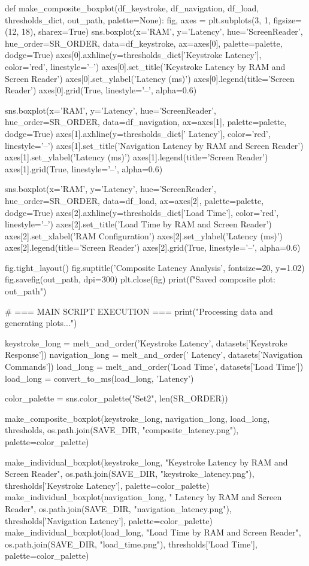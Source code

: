\begin{pyverbatim}
	def make_composite_boxplot(df_keystroke, df_navigation, df_load, thresholds_dict, out_path, palette=None):
	fig, axes = plt.subplots(3, 1, figsize=(12, 18), sharex=True)
	sns.boxplot(x='RAM', y='Latency', hue='ScreenReader', hue_order=SR_ORDER,
	data=df_keystroke, ax=axes[0], palette=palette, dodge=True)
	axes[0].axhline(y=thresholds_dict['Keystroke Latency'], color='red', linestyle='--')
	axes[0].set_title('Keystroke Latency by RAM and Screen Reader')
	axes[0].set_ylabel('Latency (ms)')
	axes[0].legend(title='Screen Reader')
	axes[0].grid(True, linestyle='--', alpha=0.6)

	sns.boxplot(x='RAM', y='Latency', hue='ScreenReader', hue_order=SR_ORDER,
	data=df_navigation, ax=axes[1], palette=palette, dodge=True)
	axes[1].axhline(y=thresholds_dict[' Latency'], color='red', linestyle='--')
	axes[1].set_title('Navigation Latency by RAM and Screen Reader')
	axes[1].set_ylabel('Latency (ms)')
	axes[1].legend(title='Screen Reader')
	axes[1].grid(True, linestyle='--', alpha=0.6)

	sns.boxplot(x='RAM', y='Latency', hue='ScreenReader', hue_order=SR_ORDER,
	data=df_load, ax=axes[2], palette=palette, dodge=True)
	axes[2].axhline(y=thresholds_dict['Load Time'], color='red', linestyle='--')
	axes[2].set_title('Load Time by RAM and Screen Reader')
	axes[2].set_xlabel('RAM Configuration')
	axes[2].set_ylabel('Latency (ms)')
	axes[2].legend(title='Screen Reader')
	axes[2].grid(True, linestyle='--', alpha=0.6)

	fig.tight_layout()
	fig.suptitle('Composite Latency Analysis', fontsize=20, y=1.02)
	fig.savefig(out_path, dpi=300)
	plt.close(fig)
	print(f"Saved composite plot: {out_path}")

	# === MAIN SCRIPT EXECUTION ===
	print("Processing data and generating plots...")

	keystroke_long = melt_and_order('Keystroke Latency', datasets['Keystroke Response'])
	navigation_long = melt_and_order(' Latency', datasets['Navigation Commands'])
	load_long = melt_and_order('Load Time', datasets['Load Time'])
	load_long = convert_to_ms(load_long, 'Latency')

	color_palette = sns.color_palette("Set2", len(SR_ORDER))

	make_composite_boxplot(keystroke_long, navigation_long, load_long, thresholds,
	os.path.join(SAVE_DIR, "composite_latency.png"), palette=color_palette)

	make_individual_boxplot(keystroke_long, "Keystroke Latency by RAM and Screen Reader",
	os.path.join(SAVE_DIR, "keystroke_latency.png"), thresholds['Keystroke Latency'], palette=color_palette)
	make_individual_boxplot(navigation_long, " Latency by RAM and Screen Reader",
	os.path.join(SAVE_DIR, "navigation_latency.png"), thresholds['Navigation Latency'], palette=color_palette)
	make_individual_boxplot(load_long, "Load Time by RAM and Screen Reader",
	os.path.join(SAVE_DIR, "load_time.png"), thresholds['Load Time'], palette=color_palette)


\end{pyverbatim}
